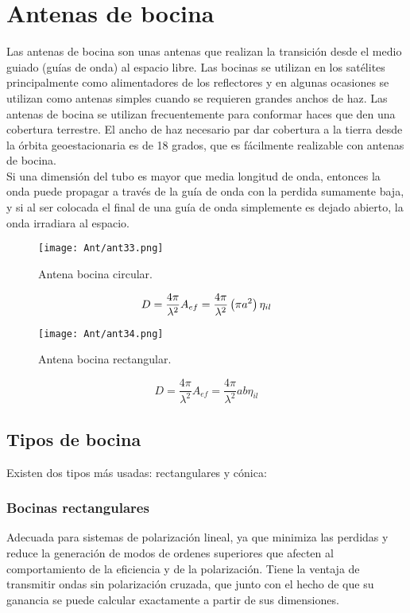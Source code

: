 \documentclass[
	12pt, %
	fleqn, %
	a4paper, %
	oneside, %
]{LegrandOrangeBook}
\begin{document}
\section{Antenas de bocina}
Las antenas de bocina son unas antenas que realizan la transición desde el medio guiado (guías de onda) al espacio libre. Las bocinas se utilizan en los satélites principalmente como alimentadores de los reflectores y en algunas ocasiones se utilizan como antenas simples cuando se requieren grandes anchos de haz. Las antenas de bocina se utilizan frecuentemente para conformar haces que den una cobertura terrestre. 
El ancho de haz necesario par dar cobertura a la tierra desde la órbita geoestacionaria es de 18 grados, que es fácilmente realizable con antenas de bocina.\\
Si una dimensión del tubo es mayor que media longitud de onda, entonces la onda puede propagar a través de la guía de onda con la perdida sumamente baja, y si al ser colocada el final de una guía de onda simplemente es dejado abierto, la onda irradiara al espacio.
\begin{figure}[H]
\centering
\texttt{[image: Ant/ant33.png]}
\caption{Antena bocina circular.}
\end{figure}
\begin{equation}
D=\frac{4\pi}{\lambda^2}A_{ef}=\frac{4\pi}{\lambda^2}\left(\pi a^2\right)\eta_{il}
\end{equation}
\begin{figure}[H]
\centering
\texttt{[image: Ant/ant34.png]}
\caption{Antena bocina rectangular.}
\end{figure}
\begin{equation}
D=\frac{4\pi}{\lambda^2}A_{ef}=\frac{4\pi}{\lambda^2}ab\eta_{il}
\end{equation}
\subsection{Tipos de bocina}
Existen dos tipos más usadas: rectangulares y cónica:
\subsubsection{Bocinas rectangulares}
Adecuada para sistemas de polarización lineal, ya que minimiza las perdidas y reduce la generación de modos de ordenes superiores que afecten al comportamiento de la eficiencia y de la polarización. Tiene la ventaja de transmitir ondas sin polarización cruzada, que junto con el hecho de que su ganancia se puede calcular exactamente a partir de sus dimensiones.
\end{document}

